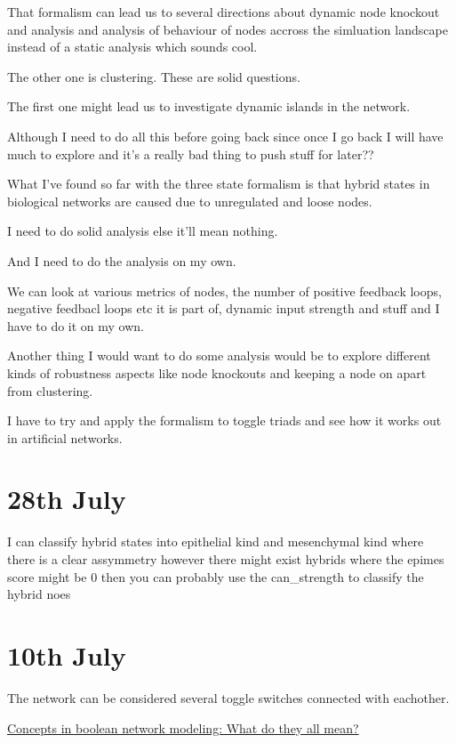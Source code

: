 \documentclass{article}
\begin{document}
That formalism can lead us to several directions about dynamic node knockout and analysis and analysis of behaviour of nodes accross the simluation landscape instead of a static analysis which sounds cool. 

The other one is clustering. These are solid questions. 

The first one might lead us to investigate dynamic islands in the network. 

Although I need to do all this before going back since once I go back I will have much to explore and it's a really bad thing to push stuff for later??

What I've found so far with the three state formalism is that hybrid states in biological networks are caused due to unregulated and loose nodes. 

I need to do solid analysis else it'll mean nothing. 

And I need to do the analysis on my own. 


We can look at various metrics of nodes, the number of positive feedback loops, negative feedbacl loops etc it is part of, dynamic input strength and stuff and I have to do it on my own. 

Another thing I would want to do some analysis would be to explore different kinds of robustness aspects like node knockouts and keeping a node on apart from clustering. 

I have to try and apply the formalism to toggle triads and see how it works out in artificial networks. 




\section{28th July}
I can classify hybrid states into epithelial kind and mesenchymal kind where there is a clear assymmetry however there might exist hybrids where the epimes score might be 0 then you can probably use the can_strength to classify the hybrid noes


\section{10th July}

The network can be considered several toggle switches connected with eachother.

\href{https://d-nb.info/122745077X/34}{Concepts in boolean network modeling: What do they all mean?} 
\end{document}
